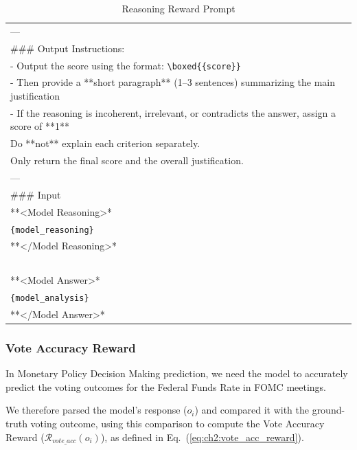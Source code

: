 \begin{table}[htbp]
\begin{tabular}{p{}}
    --- \\

    \#\#\# Output Instructions:\\

    - Output the score using the format: \texttt{\textbackslash boxed\{\{score\}\}}  \\
    - Then provide a **short paragraph** (1–3 sentences) summarizing the main justification  \\
    - If the reasoning is incoherent, irrelevant, or contradicts the answer, assign a score of **1** \\

    Do **not** explain each criterion separately.  \\
    Only return the final score and the overall justification. \\

    --- \\

    \#\#\# Input \\

    **\textless Model Reasoning\textgreater** \\
    \texttt{\{model\_reasoning\}}\\  
    **\textless /Model Reasoning\textgreater**\\
    ~\\
    **\textless Model Answer\textgreater**  \\
    \texttt{\{model\_analysis\}}  \\
    **\textless /Model Answer\textgreater** \\
    \bottomrule
    \end{tabular}
    \caption{Reasoning Reward Prompt}
    \label{tab:ch2:reasoin_reward_prompt}
\end{table}



\subsubsection*{Vote Accuracy Reward}
In Monetary Policy Decision Making prediction, we need the model to accurately predict the voting outcomes for the Federal Funds Rate in FOMC meetings.

We therefore parsed the model’s response ($o_i$) and compared it with the ground-truth voting outcome, using this comparison to compute the Vote Accuracy Reward ($\mathcal{R}_{vote\_acc}(o_i)$), as defined in Eq.~(\ref{eq:ch2:vote_acc_reward}).

